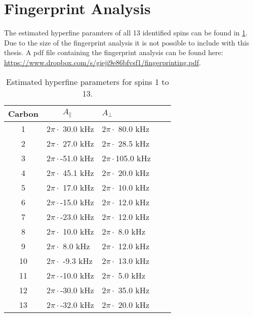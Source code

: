 \section{Fingerprint Analysis}
\label{chap:Fingerprint_data_appendix}
The estimated hyperfine paramters of all 13 identified spins can be found in \cref{tbl:HF_par_appendix}. Due to the size of the fingerprint analysis it is not possible to include with this thesis. A pdf file containing the fingerprint analysis can be found here: \url{https://www.dropbox.com/s/gieji9e86bfvsf1/fingerprinting.pdf}.

\begin{table}[htbp]
    \centering
    \caption{Estimated hyperfine parameters for spins 1 to 13.}
    \begin{tabular}{cllll}
    Carbon &  $\quad \quad A_{\parallel} $ &\quad \quad  $A_{\perp}$ \\ \hline
    1 & 2$\pi \cdot ${ }30.0 kHz & 2$\pi \cdot ${ }80.0 kHz \\
    2 & 2$\pi \cdot ${ }27.0 kHz & 2$\pi \cdot ${ }28.5 kHz \\
    3 & 2$\pi \cdot $-51.0 kHz & 2$\pi \cdot $105.0 kHz \\
    4 & 2$\pi \cdot ${ }45.1 kHz & 2$\pi \cdot ${ }20.0 kHz \\
    5 & 2$\pi \cdot ${ }17.0 kHz & 2$\pi \cdot ${ }10.0 kHz \\
    6 & 2$\pi \cdot $-15.0 kHz & 2$\pi \cdot ${ }12.0 kHz \\
    7 & 2$\pi \cdot $-23.0 kHz & 2$\pi \cdot ${ }12.0 kHz \\
    8 & 2$\pi \cdot ${ }10.0 kHz & 2$\pi \cdot ${ }{ }8.0 kHz \\
    9 & 2$\pi \cdot ${ }{ }8.0 kHz & 2$\pi \cdot ${ }12.0 kHz \\
    10 & 2$\pi \cdot ${ }-9.3 kHz & 2$\pi \cdot ${ }13.0 kHz \\
    11 & 2$\pi \cdot $-10.0 kHz & 2$\pi \cdot ${ }{ }5.0 kHz \\
    12 & 2$\pi \cdot $-30.0 kHz & 2$\pi \cdot ${ }35.0 kHz \\
    13 & 2$\pi \cdot $-32.0 kHz & 2$\pi \cdot ${ }20.0 kHz \\
    \end{tabular}
    \label{tbl:HF_par_appendix}
\end{table}
